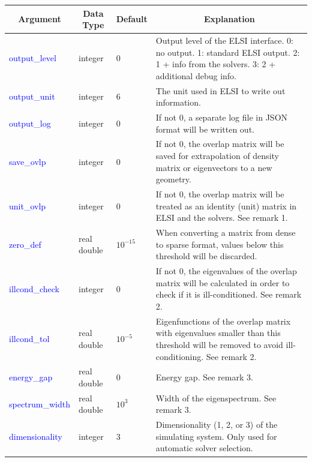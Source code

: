 \documentclass{report}
\begin{document}
\begin{tabular}[]{|p{30mm}|p{20mm}|p{15mm}|p{100mm}|}
\hline
\multicolumn{1}{|c|}{\textbf{Argument}} & \multicolumn{1}{c|}{\textbf{Data Type}} & \multicolumn{1}{c|}{\textbf{Default}} & \multicolumn{1}{c|}{\textbf{Explanation}}\\
\hline
\textcolor{blue}{output\_level}       & integer            & 0          & Output level of the ELSI interface.  0: no output.  1:  standard ELSI output.  2:  1 + info from the solvers.  3:  2 + additional debug info.\\
\hline
\textcolor{blue}{output\_unit}        & integer            & 6          & The unit used in ELSI to write out information.\\
\hline
\textcolor{blue}{output\_log}         & integer            & 0          & If not 0, a separate log file in JSON format will be written out.\\
\hline
\textcolor{blue}{save\_ovlp }         & integer            & 0          & If not 0, the overlap matrix will be saved for extrapolation of density matrix or eigenvectors to a new geometry.\\
\hline
\textcolor{blue}{unit\_ovlp }         & integer            & 0          & If not 0, the overlap matrix will be treated as an identity (unit) matrix in ELSI and the solvers.  See remark 1.\\
\hline
\textcolor{blue}{zero\_def }          & real double        & $10^{-15}$ & When converting a matrix from dense to sparse format, values below this threshold will be discarded.\\
\hline
\textcolor{blue}{illcond\_check}      & integer            & 0          & If not 0, the eigenvalues of the overlap matrix will be calculated in order to check if it is ill-conditioned.  See remark 2.\\
\hline
\textcolor{blue}{illcond\_tol}        & real double        & $10^{-5}$  & Eigenfunctions of the overlap matrix with eigenvalues smaller than this threshold will be removed to avoid ill-conditioning.  See remark 2.\\
\hline
\textcolor{blue}{energy\_gap}         & real double        & 0          & Energy gap.  See remark 3.\\
\hline
\textcolor{blue}{spectrum\_width}     & real double        & $10^{3}$   & Width of the eigenspectrum.  See remark 3.\\
\hline
\textcolor{blue}{dimensionality}      & integer            & 3          & Dimensionality (1, 2, or 3) of the simulating system.  Only used for automatic solver selection.\\

\end{tabular}
\end{document}
